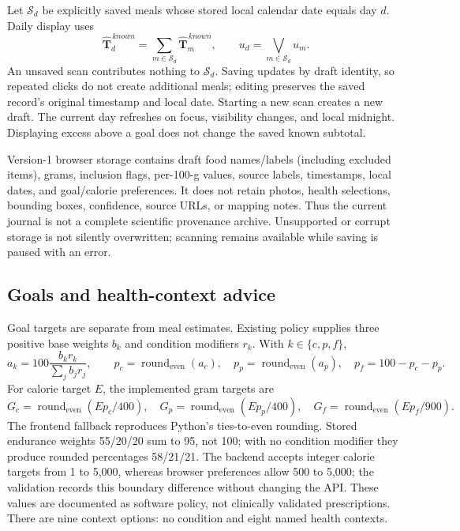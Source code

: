 \documentclass[12pt,journal,draftclsnofoot,onecolumn]{IEEEtran}
\newcommand{\roundeven}{\operatorname{round}_{\mathrm{even}}}
\begin{document}
Let $\mathcal{S}_d$ be explicitly saved meals whose stored local calendar date equals day $d$. Daily display uses
\begin{equation}
\widehat{\mathbf{T}}_d^{\,known}
=\sum_{m\in\mathcal{S}_d}\widehat{\mathbf{T}}_m^{\,known},
\qquad
u_d=\bigvee_{m\in\mathcal{S}_d}u_m.
\label{eq:day}
\end{equation}
An unsaved scan contributes nothing to $\mathcal{S}_d$. Saving updates by draft identity, so repeated clicks do not create additional meals; editing preserves the saved record's original timestamp and local date. Starting a new scan creates a new draft. The current day refreshes on focus, visibility changes, and local midnight. Displaying excess above a goal does not change the saved known subtotal.

Version-1 browser storage contains draft food names/labels (including excluded items), grams, inclusion flags, per-100-g values, source labels, timestamps, local dates, and goal/calorie preferences. It does not retain photos, health selections, bounding boxes, confidence, source URLs, or mapping notes. Thus the current journal is not a complete scientific provenance archive. Unsupported or corrupt storage is not silently overwritten; scanning remains available while saving is paused with an error.

\subsection{Goals and health-context advice}
Goal targets are separate from meal estimates. Existing policy supplies three positive base weights $b_k$ and condition modifiers $r_k$. With $k\in\{c,p,f\}$,
\begin{equation}
a_k=100\frac{b_kr_k}{\sum_j b_jr_j},\qquad
p_c=\roundeven(a_c),\quad
p_p=\roundeven(a_p),\quad p_f=100-p_c-p_p.
\end{equation}
For calorie target $E$, the implemented gram targets are
\begin{equation}
G_c=\roundeven(Ep_c/400),\quad
G_p=\roundeven(Ep_p/400),\quad
G_f=\roundeven(Ep_f/900).
\end{equation}
The frontend fallback reproduces Python's ties-to-even rounding. Stored endurance weights 55/20/20 sum to 95, not 100; with no condition modifier they produce rounded percentages 58/21/21. The backend accepts integer calorie targets from 1 to 5,000, whereas browser preferences allow 500 to 5,000; the validation records this boundary difference without changing the API. These values are documented as software policy, not clinically validated prescriptions. There are nine context options: no condition and eight named health contexts.
\end{document}
